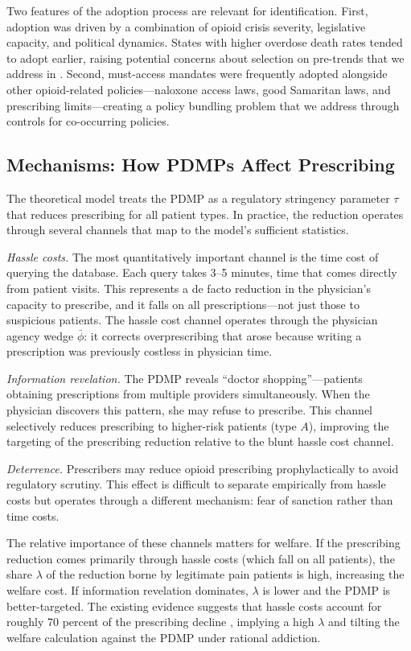 \documentclass[12pt]{article}
\begin{document}
Two features of the adoption process are relevant for identification. First, adoption was driven by a combination of opioid crisis severity, legislative capacity, and political dynamics. States with higher overdose death rates tended to adopt earlier, raising potential concerns about selection on pre-trends that we address in . Second, must-access mandates were frequently adopted alongside other opioid-related policies---naloxone access laws, good Samaritan laws, and prescribing limits---creating a policy bundling problem that we address through controls for co-occurring policies.

\subsection{Mechanisms: How PDMPs Affect Prescribing}\label{sec:background_mechanisms}

The theoretical model treats the PDMP as a regulatory stringency parameter $\tau$ that reduces prescribing for all patient types. In practice, the reduction operates through several channels that map to the model's sufficient statistics.

\textit{Hassle costs.} The most quantitatively important channel is the time cost of querying the database. Each query takes 3--5 minutes, time that comes directly from patient visits. This represents a de facto reduction in the physician's capacity to prescribe, and it falls on all prescriptions---not just those to suspicious patients. The hassle cost channel operates through the physician agency wedge $\bar{\phi}$: it corrects overprescribing that arose because writing a prescription was previously costless in physician time.

\textit{Information revelation.} The PDMP reveals ``doctor shopping''---patients obtaining prescriptions from multiple providers simultaneously. When the physician discovers this pattern, she may refuse to prescribe. This channel selectively reduces prescribing to higher-risk patients (type $A$), improving the targeting of the prescribing reduction relative to the blunt hassle cost channel.

\textit{Deterrence.} Prescribers may reduce opioid prescribing prophylactically to avoid regulatory scrutiny. This effect is difficult to separate empirically from hassle costs but operates through a different mechanism: fear of sanction rather than time costs.

The relative importance of these channels matters for welfare. If the prescribing reduction comes primarily through hassle costs (which fall on all patients), the share $\lambda$ of the reduction borne by legitimate pain patients is high, increasing the welfare cost. If information revelation dominates, $\lambda$ is lower and the PDMP is better-targeted. The existing evidence suggests that hassle costs account for roughly 70 percent of the prescribing decline \citep{buchmueller2018effect}, implying a high $\lambda$ and tilting the welfare calculation against the PDMP under rational addiction.
\end{document}
